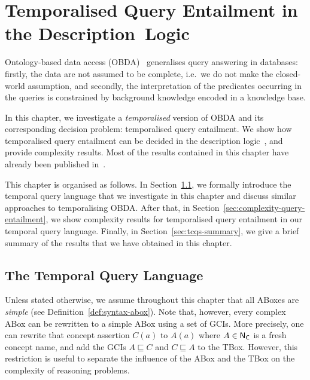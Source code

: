 \chapter[Temporalised Query Entailment in~\texorpdfstring{\SHQ}{SHQ}]{%
    Temporalised Query Entailment in the Description~Logic~\texorpdfstring{\SHQ}{SHQ}}\label{ch:tcqs}

Ontology-based data access (OBDA)~\cite{DEF+-DS99,PCD+-JoDS08} generalises query
answering in databases: firstly, the data are not assumed to be complete,
i.e.~we do not make the closed-world assumption, and secondly, the
interpretation of the predicates occurring in the queries is constrained by
background knowledge encoded in a knowledge base.

In this chapter, we investigate a \emph{temporalised} version of OBDA and its
corresponding decision problem: temporalised query entailment.  We show how
temporalised query entailment can be decided in the description logic~\SHQ, and
provide complexity results.
%
Most of the results contained in this chapter have already been published
in~\cite{BaBL-CADE13,BaBL-LTCS-13-01}.

This chapter is organised as follows.  In Section~\ref{sec:temporal-queries}, we
formally introduce the temporal query language that we investigate in this
chapter and discuss similar approaches to temporalising OBDA\@.  After that, in
Section~\ref{sec:complexity-query-entailment}, we show complexity results for
temporalised query entailment in our temporal query language.  Finally, in
Section~\ref{sec:tcqs-summary}, we give a brief summary of the results that we
have obtained in this chapter.


\section{The Temporal Query Language}\label{sec:temporal-queries}

Unless stated otherwise, we assume throughout this chapter that all ABoxes are
\emph{simple} (see Definition~\ref{def:syntax-abox}).  Note that, however, every
complex ABox can be rewritten to a simple ABox using a set of GCIs.  More
precisely, one can rewrite that concept assertion $C(a)$ to $A(a)$ where
$A\in\mathsf{N_C}$ is a fresh concept name, and add the GCIs $A\sqsubseteq C$ and
$C\sqsubseteq A$ to the TBox.  However, this restriction is useful to separate
the influence of the ABox and the TBox on the complexity of reasoning problems.

